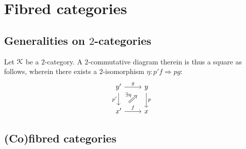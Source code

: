 \section{Fibred categories}
    \subsection{Generalities on \texorpdfstring{$2$}{}-categories}
        \begin{definition}[$2$-categories] \label{def: 2_categories}
            
        \end{definition}
        
        \begin{definition} \label{def: 2_commutative_diagrams}
            Let $\mathcal{K}$ be a $2$-category. A $2$-commutative diagram therein is thus a square as follows, wherein there exists a $2$-isomorphism $\eta: p'f \Rightarrow pg$:
                $$
                    \begin{tikzcd}
                    	{y'} & y \\
                    	{x'} & x
                    	\arrow["{p'}"', from=1-1, to=2-1]
                    	\arrow["f", from=2-1, to=2-2]
                    	\arrow["g", from=1-1, to=1-2]
                    	\arrow["p", from=1-2, to=2-2]
                    	\arrow["\exists \eta", shorten <=8pt, shorten >=8pt, Rightarrow, from=2-1, to=1-2]
                    \end{tikzcd}
                $$
        \end{definition}
    
    \subsection{(Co)fibred categories}
